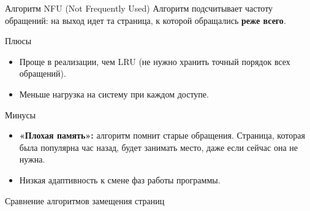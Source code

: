 \documentclass[10pt,pdf,hyperref={unicode}]{beamer}
\begin{document}
\begin{frame}{Алгоритм NFU (Not Frequently Used)}
    Алгоритм подсчитывает частоту обращений: на выход идет та страница, к которой обращались \textbf{реже всего}.

    \begin{block}{Плюсы}
        \begin{itemize}
            \item Проще в реализации, чем LRU (не нужно хранить точный порядок всех обращений).
            \item Меньше нагрузка на систему при каждом доступе.
        \end{itemize}
    \end{block}

    \begin{alertblock}{Минусы}
        \begin{itemize}
            \item \textbf{«Плохая память»:} алгоритм помнит старые обращения. Страница, которая была популярна час назад, будет занимать место, даже если сейчас она не нужна.
            \item Низкая адаптивность к смене фаз работы программы.
        \end{itemize}
    \end{alertblock}
\end{frame}
\begin{frame}{Сравнение алгоритмов замещения страниц}
    \centering
    
\end{frame}
\end{document}
